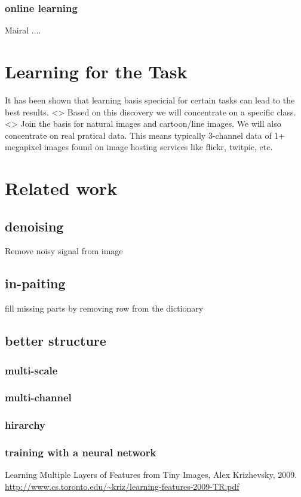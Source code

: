 \subsubsection{online learning}
Mairal .... \cite{Mairal2010}

\section{Learning for the Task}
It has been shown that learning basis specicial for certain tasks can lead to the best results\cite{}.  <>
Based on this discovery we will concentrate on a specific class. <> Join the basis for natural images and cartoon/line images.
We will also concentrate on real pratical data. This means typically 3-channel data of 1+ megapixel images found on image hosting services like flickr, twitpic, etc.

\section{Related work}
\subsection{denoising}
Remove noisy signal from image

\subsection{in-paiting}
fill missing parts by removing row from the dictionary

\subsection{better structure}

\subsubsection{multi-scale}
\subsubsection{multi-channel}
\subsubsection{hirarchy}
\subsubsection{training with a neural network}
Learning Multiple Layers of Features from Tiny Images, Alex Krizhevsky, 2009.\\
\url{http://www.cs.toronto.edu/~kriz/learning-features-2009-TR.pdf}


